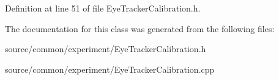 Definition at line 51 of file Eye\-Tracker\-Calibration.\-h.



The documentation for this class was generated from the following files\-:\begin{DoxyCompactItemize}
\item 
source/common/experiment/Eye\-Tracker\-Calibration.\-h\item 
source/common/experiment/Eye\-Tracker\-Calibration.\-cpp\end{DoxyCompactItemize}
